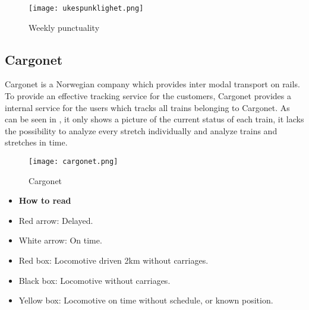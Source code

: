 \begin{figure}[!htbp]
	\texttt{[image: ukespunklighet.png]}
	\caption[Weekly punctuality]{Weekly punctuality\cite{sintefPresis}}
	\label{fig:ukespunklighet}
\end{figure}

\subsection{Cargonet} %
\label{sub:subsection_cargonet}

Cargonet is a Norwegian company which provides inter modal transport on rails. 
To provide an effective tracking service for the customers, Cargonet provides 
a internal service for the users which tracks all trains belonging to Cargonet.
As can be seen in , it only shows a picture of the current
status of each train, it lacks the possibility to analyze every stretch 
individually  and analyze trains and stretches in time.

\begin{figure}[!htbp]
	\texttt{[image: cargonet.png]}
	\caption[Cargonet]{Cargonet \cite{cargonet}}
	\label{fig:cargonet}
\end{figure}

\begin{itemize}
	\item [] \textbf{How to read }
	\item Red arrow:\hspace{4ex} Delayed.
	\item White arrow:\hspace{4ex} On time.
	\item Red box:\hspace{4ex} Locomotive driven 2km without carriages.
	\item Black box:\hspace{4ex} Locomotive without carriages.
	\item Yellow box:\hspace{4ex} Locomotive on time without schedule, or known position.
\end{itemize}

